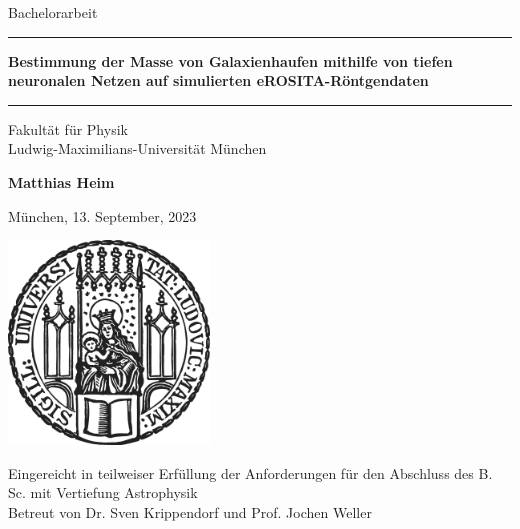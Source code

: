 \documentclass[12pt]{article}
\newcommand{\mytitleger}{Bestimmung der Masse von Galaxienhaufen mithilfe von tiefen neuronalen Netzen auf simulierten eROSITA-Röntgendaten}
\newcommand{\myname}{Matthias Heim}
\newcommand{\mysupervisorger}{Dr. Sven Krippendorf und Prof. Jochen Weller}
\numberwithin{equation}{subsection}
\begin{document}
\begin{titlepage}
\begin{center}
    
\LARGE
Bachelorarbeit
    
\vspace{0.5cm}
      
\rule{\textwidth}{1.5pt}
\LARGE
\textbf{\mytitleger}
\rule{\textwidth}{1.5pt}
   
\vspace{0.5cm}
      
\large
Fakultät für Physik \\
Ludwig-Maximilians-Universität München 

\vfill

\Large
\textbf{\myname}

\vfill

\large
München, 13. September, 2023
      
\vfill

\includegraphics[width = 0.4\textwidth]{sigillum.png}

\vfill

\normalsize
Eingereicht in teilweiser Erfüllung der Anforderungen für den Abschluss des B. Sc. mit Vertiefung Astrophysik
\\

Betreut von \mysupervisorger

\end{center}
\end{titlepage}


\end{document}
